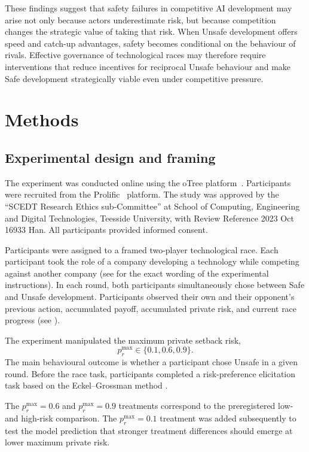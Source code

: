 \documentclass[pdflatex,sn-mathphys-ay]{sn-jnl}
\theoremstyle{thmstyleone}
\theoremstyle{thmstyletwo}
\theoremstyle{thmstylethree}
\begin{document}
These findings suggest that safety failures in competitive AI development may arise not only because actors underestimate risk, but because competition changes the strategic value of taking that risk. When Unsafe development offers speed and catch-up advantages, safety becomes conditional on the behaviour of rivals. Effective governance of technological races may therefore require interventions that reduce incentives for reciprocal Unsafe behaviour and make Safe development strategically viable even under competitive pressure.

\section{Methods}\label{sec:methods}

\subsection{Experimental design and framing}

The experiment was conducted online using the oTree platform~\citep{chen2016otree}. Participants were recruited from the Prolific~\citep{palan2018prolific} platform. The study was approved by the ``SCEDT Research Ethics sub-Committee'' at School of Computing, Engineering and Digital Technologies, Teesside University, with Review Reference 2023 Oct 16933 Han. All participants provided informed consent.

Participants were assigned to a framed two-player technological race. Each participant took the role of a company developing a technology while competing against another company (see  for the exact wording of the experimental instructions). In each round, both participants simultaneously chose between Safe and Unsafe development. Participants observed their own and their opponent's previous action, accumulated payoff, accumulated private risk, and current race progress (see ).

The experiment manipulated the maximum private setback risk,
\[
p_r^{\max}\in\{0.1,0.6,0.9\}.
\]
The main behavioural outcome is whether a participant chose Unsafe in a given round. Before the race task, participants completed a risk-preference elicitation task based on the Eckel--Grossman method \citep{eckel2008forecastingRiskAttitudes,dave2010elicitingRiskPreferences}.

The \(p_r^{\max}=0.6\) and \(p_r^{\max}=0.9\) treatments correspond to the preregistered low- and high-risk comparison. The \(p_r^{\max}=0.1\) treatment was added subsequently to test the model prediction that stronger treatment differences should emerge at lower maximum private risk.
\end{document}

